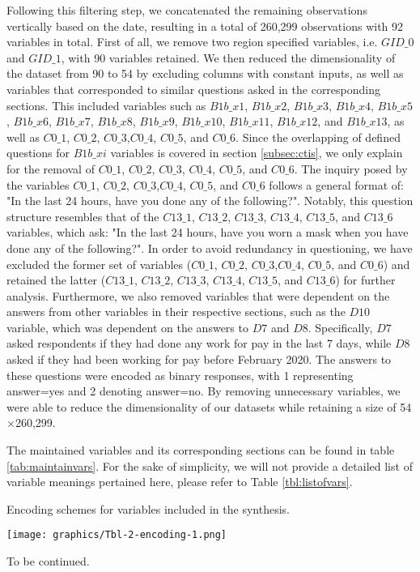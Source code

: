 Following this filtering step, we concatenated the remaining observations vertically based on the date, resulting in a total of 260,299 observations with 92 variables in total. 
First of all, we remove two region specified variables, i.e. $GID\_0$ and $GID\_1$, with 90 variables retained. We then reduced the dimensionality of the dataset from 90 to 54 by excluding columns with constant inputs, as well as variables that corresponded to similar questions asked in the corresponding sections. This included variables such as $B1b\_x1$, $B1b\_x2$, $B1b\_x3$, $B1b\_x4$, $B1b\_x5$, $B1b\_x6$, $B1b\_x7$, $B1b\_x8$, $B1b\_x9$, $B1b\_x10$, $B1b\_x11$, $B1b\_x12$, and $B1b\_x13$, as well as $C0\_1$, $C0\_2$, $C0\_3$,$C0\_4$, $C0\_5$, and $C0\_6$. Since the overlapping of defined questions for $B1b\_xi$ variables is covered in section \ref{subsec:ctis}, we only explain for the removal of $C0\_1$, $C0\_2$, $C0\_3$, $C0\_4$, $C0\_5$, and $C0\_6$.  The inquiry posed by the variables $C0\_1$, $C0\_2$, $C0\_3$,$C0\_4$, $C0\_5$, and $C0\_6$ follows a general format of: "In the last 24 hours, have you done any of the following?". Notably, this question structure resembles that of the $C13\_1$, $C13\_2$, $C13\_3$, $C13\_4$, 
$C13\_5$, and $C13\_6$ variables, which ask: "In the last 24 hours, have you worn a mask when you have done any of the following?". In order to avoid redundancy in questioning, we have excluded the former set of variables ($C0\_1$, $C0\_2$, $C0\_3$,$C0\_4$, $C0\_5$, and $C0\_6$) and retained the latter ($C13\_1$, $C13\_2$, $C13\_3$, $C13\_4$, $C13\_5$, and $C13\_6$) for further analysis. Furthermore, we also removed variables that were dependent on the answers from other variables in their respective sections, such as the $D10$ variable, which was dependent on the answers to $D7$ and $D8$. Specifically, $D7$ asked respondents if they had done any work for pay in the last 7 days, while $D8$ asked if they had been working for pay before February 2020. The answers to these questions were encoded as binary responses, with 1 representing answer=yes and 2 denoting answer=no. By removing unnecessary variables, we were able to reduce the dimensionality of our datasets while retaining a size of 54$\times$260,299. 

The maintained variables and its corresponding sections can be found in table \ref{tab:maintainvars}. For the sake of simplicity, we will not provide a detailed list of variable meanings pertained here, please refer to Table \ref{tbl:listofvars}.
\begin{table}[H]
\centering
  \caption{Encoding schemes for variables included in the synthesis.}
  \label{tab:maintainvars}
  \texttt{[image: graphics/Tbl-2-encoding-1.png]}
  {\raggedleft To be continued.\par}
\end{table}

